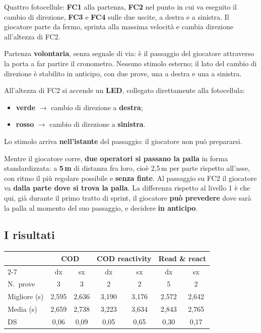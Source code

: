 Quattro fotocellule: \textbf{FC1} alla partenza, \textbf{FC2} nel punto in cui va eseguito il
cambio di direzione, \textbf{FC3} e \textbf{FC4} sulle due uscite, a destra e a sinistra. Il
giocatore parte da fermo, sprinta alla massima velocità e cambia direzione all'altezza di FC2.

Partenza \textbf{volontaria}, senza segnale di via: è il passaggio del giocatore attraverso la
porta a far partire il cronometro. Nessuno stimolo esterno; il lato del cambio di direzione è
stabilito in anticipo, con due prove, una a destra e una a sinistra.

All'altezza di FC2 si accende un \textbf{LED}, collegato direttamente alla fotocellula:
\begin{itemize}
  \item \textbf{verde} $\rightarrow$ cambio di direzione a \textbf{destra};
  \item \textbf{rosso} $\rightarrow$ cambio di direzione a \textbf{sinistra}.
\end{itemize}
Lo stimolo arriva \textbf{nell'istante} del passaggio: il giocatore non può prepararsi.

Mentre il giocatore corre, \textbf{due operatori si passano la palla} in forma standardizzata:
a \textbf{5\,m} di distanza fra loro, cioè 2,5\,m per parte rispetto all'asse, con ritmo il più
regolare possibile e \textbf{senza finte}. Al passaggio su FC2 il giocatore va \textbf{dalla parte
dove si trova la palla}. La differenza rispetto al livello 1 è che qui, già durante il primo tratto
di sprint, il giocatore \textbf{può prevedere} dove sarà la palla al momento del suo passaggio, e
decidere \textbf{in anticipo}.

\subsection{I risultati}

\begin{table}[htbp]
  \centering
  \small
  \renewcommand{\arraystretch}{1.3}
  \begin{tabularx}{\textwidth}{|X|c|c|c|c|c|c|}
    \hline
    & \multicolumn{2}{c|}{\textbf{COD}} & \multicolumn{2}{c|}{\textbf{COD reactivity}} &
      \multicolumn{2}{c|}{\textbf{Read \& react}} \\
    \cline{2-7}
    & dx & sx & dx & sx & dx & sx \\
    \hline
    N.\ prove & 3 & 3 & 2 & 2 & 5 & 2 \\
    \hline
    Migliore (s) & 2,595 & 2,636 & 3,190 & 3,176 & 2,572 & 2,642 \\
    \hline
    Media (s) & 2,659 & 2,738 & 3,223 & 3,634 & 2,843 & 2,765 \\
    \hline
    DS & 0,06 & 0,09 & 0,05 & 0,65 & 0,30 & 0,17 \\
    \hline
  \end{tabularx}
\end{table}

